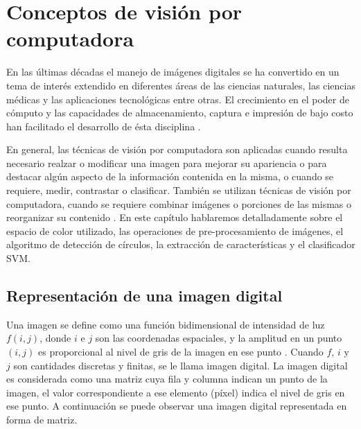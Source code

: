 
\newpage{\ } 
\thispagestyle{empty} 

\chapter{Conceptos de visión por computadora}
En las últimas décadas el manejo de imágenes digitales se ha convertido  en un tema de interés extendido en diferentes áreas de las ciencias naturales, las ciencias médicas y las aplicaciones tecnológicas entre otras. El crecimiento en el poder de cómputo y las capacidades de almacenamiento, captura e impresión de bajo costo han facilitado el desarrollo de ésta disciplina \cite{ortiz2013procesamiento}.

En general, las técnicas de visión por computadora son aplicadas cuando resulta necesario realzar o modificar una imagen para mejorar su apariencia o para destacar algún aspecto de la información contenida en la misma, o cuando se  requiere,  medir,  contrastar o clasificar.
También se utilizan técnicas de visión por computadora, cuando se requiere combinar imágenes o porciones de las mismas o reorganizar su contenido \cite{medina1997bases}. En este capítulo hablaremos detalladamente sobre el espacio de color utilizado, las operaciones de pre-procesamiento de imágenes, el algoritmo de detección de círculos, la extracción de características y el clasificador SVM.

\section{Representación de una imagen digital}

Una imagen se define como una función bidimensional de intensidad de luz $f(i,j)$, donde $i$ e $j$ son las coordenadas espaciales, y la amplitud en un punto $(i,j)$ es proporcional al nivel de gris de la imagen en ese punto \cite{gonzalezdigital}. Cuando $ f$, $i$ y $j$  son cantidades discretas y finitas, se le llama  imagen  digital.  La  imagen  digital  es  considerada  como  una  matriz  cuya  fila  y  columna indican un punto de la imagen, el valor correspondiente a ese elemento (píxel) indica el nivel de gris en ese punto. A continuación se puede observar una imagen digital representada en forma de matriz.

